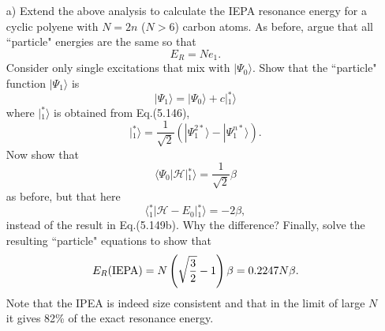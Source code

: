 \documentclass[a4paper]{book}
\newcounter{exercise}[chapter]
\begin{document}
	\begin{exercise}
	\begin{enumerate}
	
	\item[a)] Extend the above analysis to calculate the IEPA resonance energy for a cyclic polyene with $N=2n$ ($N>6$) carbon atoms. As before, argue that all ``particle" energies are the same so that
	\[
		E_R = N e_1.
	\]
	Consider only single excitations that mix with $| \Psi_0 \rangle$. Show that the ``particle" function $| \Psi_1 \rangle$ is
	\[
		| \Psi_1 \rangle = | \Psi_0 \rangle + c | {}^*_1 \rangle
	\]
	where $| {}^{*}_1 \rangle$ is obtained from Eq.(5.146),
	\[
		| {}^*_1 \rangle = \frac{1}{\sqrt{2}} \left( | \Psi^{2*}_1 \rangle - | \Psi^{n*}_1 \rangle \right).
	\]
	Now show that
	\[
		\langle \Psi_0 | \mathscr{H} | {}^*_1 \rangle = \frac{1}{\sqrt{2}} \beta
	\]
	as before, but that here
	\[
		\langle {}^*_1 | \mathscr{H} - E_0 | {}^*_1 \rangle = -2 \beta,
	\]
	instead of the result in Eq.(5.149b). Why the difference? Finally, solve the resulting ``particle" equations to show that
	\[
		E_R({\rm IEPA}) = N\left( \sqrt{ \frac{3}{2} } -1 \right) \beta = 0.2247 N \beta.
	\]
	Note that the IPEA is indeed size consistent and that in the limit of large $N$ it gives 82\% of the exact resonance energy.
	

\end{enumerate}
\end{exercise}
\end{document}
